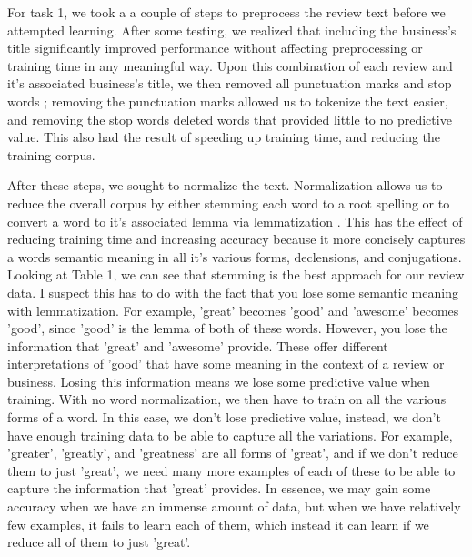 \documentclass{article}
\begin{document}
For task 1, we took a a couple of steps to preprocess the review text before we attempted learning. After some testing, we realized that including the business's title significantly improved performance without affecting preprocessing or training time in any meaningful way. Upon this combination of each review and it's associated business's title, we then removed all punctuation marks and stop words \cite{wiki:stopwords}; removing the punctuation marks allowed us to tokenize the text easier, and removing the stop words deleted words that provided little to no predictive value. This also had the result of speeding up training time, and reducing the training corpus. 

After these steps, we sought to normalize the text. Normalization allows us to reduce the overall corpus by either stemming \cite{wiki:stem} each word to a root spelling or to convert a word to it's associated lemma via lemmatization \cite{wiki:lemma}. This has the effect of reducing training time and increasing accuracy because it more concisely captures a words semantic meaning in all it's various forms, declensions, and conjugations. Looking at Table 1, we can see that stemming is the best approach for our review data. I suspect this has to do with the fact that you lose some semantic meaning with lemmatization. For example, 'great' becomes 'good' and 'awesome' becomes 'good', since 'good' is the lemma of both of these words. However, you lose the information that 'great' and 'awesome' provide. These offer different interpretations of 'good' that have some meaning in the context of a review or business. Losing this information means we lose some predictive value when training. With no word normalization, we then have to train on all the various forms of a word. In this case, we don't lose predictive value, instead, we don't have enough training data to be able to capture all the variations. For example, 'greater', 'greatly', and 'greatness' are all forms of 'great', and if we don't reduce them to just 'great', we need many more examples of each of these to be able to capture the information that 'great' provides. In essence, we may gain some accuracy when we have an immense amount of data, but when we have relatively few examples, it fails to learn each of them, which instead it can learn if we reduce all of them to just 'great'. 
\end{document}
